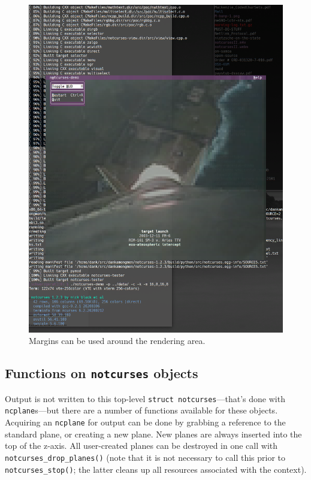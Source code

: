 \documentclass[letterpaper,10pt]{article}
\begin{document}
\begin{figure}[!htb]
    \centering
    \includegraphics[width=.75\linewidth]{media/margins.png}
    \caption{Margins can be used around the rendering area.}
    \label{fig:margins}
\end{figure}

\subsection{Functions on \texttt{notcurses} objects}
\label{sec:notcursesfuncs}
Output is not written to this top-level \texttt{struct notcurses}---that's
done with \texttt{ncplane}s---but there are a number of functions
available for these objects. Acquiring an \texttt{ncplane} for output can be
done by grabbing a reference to the standard plane, or creating a new plane.
New planes are always inserted into the top of the z-axis. All user-created
planes can be destroyed in one call with \texttt{notcurses\_drop\_planes()} (note
that it is not necessary to call this prior to \texttt{notcurses\_stop()}; the
latter cleans up all resources associated with the context).
\end{document}
